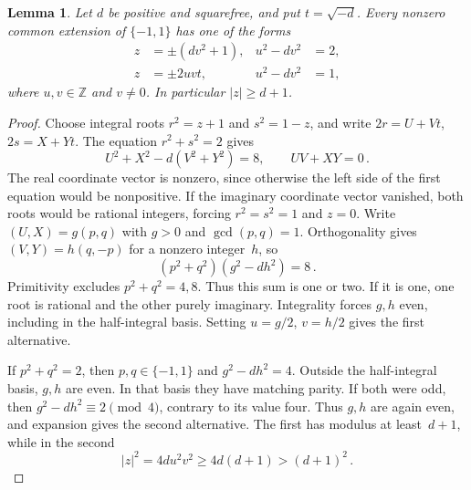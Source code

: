 \documentclass[12pt]{article}
\newtheorem{lemma}[theorem]{Lemma}
\numberwithin{equation}{section}
\begin{document}
\begin{lemma}\label{sm:bs7-unit-axes}
Let $d$ be positive and squarefree, and put $t=\sqrt{-d}$. Every nonzero common extension of $\{-1,1\}$ has one of the forms
\begin{align*}
 z&=\pm(dv^2+1),& u^2-dv^2&=2,\\
 z&=\pm2uvt,& u^2-dv^2&=1,
\end{align*}
where $u,v\in\mathbb Z$ and $v\ne0$. In particular $|z|\ge d+1$.
\end{lemma}
\begin{proof}
Choose integral roots $r^2=z+1$ and $s^2=1-z$, and write $2r=U+Vt$, $2s=X+Yt$. The equation $r^2+s^2=2$ gives
\begin{equation*}
 U^2+X^2-d(V^2+Y^2)=8,\qquad UV+XY=0\,.
\end{equation*}
The real coordinate vector is nonzero, since otherwise the left side of the first equation would be nonpositive. If the imaginary coordinate vector vanished, both roots would be rational integers, forcing $r^2=s^2=1$ and $z=0$. Write $(U,X)=g(p,q)$ with $g>0$ and $\gcd(p,q)=1$. Orthogonality gives $(V,Y)=h(q,-p)$ for a nonzero integer~$h$, so
\begin{equation*}
 (p^2+q^2)(g^2-dh^2)=8\,.
\end{equation*}
Primitivity excludes $p^2+q^2=4,8$. Thus this sum is one or two. If it is one, one root is rational and the other purely imaginary. Integrality forces $g,h$ even, including in the half-integral basis. Setting $u=g/2$, $v=h/2$ gives the first alternative.

If $p^2+q^2=2$, then $p,q\in\{-1,1\}$ and $g^2-dh^2=4$. Outside the half-integral basis, $g,h$ are even. In that basis they have matching parity. If both were odd, then $g^2-dh^2\equiv2\pmod4$, contrary to its value four. Thus $g,h$ are again even, and expansion gives the second alternative. The first has modulus at least~$d+1$, while in the second
\begin{equation*}
 |z|^2=4du^2v^2\ge4d(d+1)>(d+1)^2\,.
\end{equation*}
\end{proof}
\end{document}
